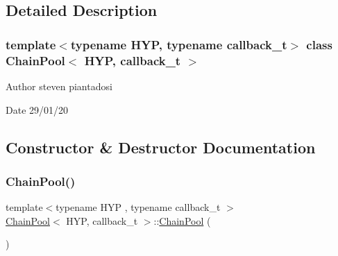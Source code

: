 \subsection{Detailed Description}
\subsubsection*{template$<$typename H\+YP, typename callback\+\_\+t$>$\newline
class Chain\+Pool$<$ H\+Y\+P, callback\+\_\+t $>$}

\begin{DoxyAuthor}{Author}
steven piantadosi 
\end{DoxyAuthor}
\begin{DoxyDate}{Date}
29/01/20 
\end{DoxyDate}


\subsection{Constructor \& Destructor Documentation}
\mbox{\label{class_chain_pool_ae8795a9a7c0fff45c82334fa821c8c3c}} 
\subsubsection{\texorpdfstring{Chain\+Pool()}{ChainPool()}\hspace{0.1cm}{\footnotesize\ttfamily [1/2]}}
{\footnotesize\ttfamily template$<$typename H\+YP , typename callback\+\_\+t $>$ \\
\hyperlink{class_chain_pool}{Chain\+Pool}$<$ H\+YP, callback\+\_\+t $>$\+::\hyperlink{class_chain_pool}{Chain\+Pool} (\begin{DoxyParamCaption}{ }\end{DoxyParamCaption})\hspace{0.3cm}{\ttfamily [inline]}}

\mbox{\label{class_chain_pool_a7794efde5588ecbf3603170d6226cd6f}} 

